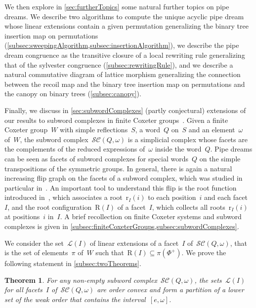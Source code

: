 \documentclass[reqno]{amsart}
\newtheorem{theoremA}{Theorem}
\theoremstyle{definition}
\newcommand{\linearExtensions}{\mathcal{L}} %
\newcommand{\subwordComplex}{\mathcal{SC}} %
\newcommand{\Roots}{\mathrm{R}} %
\newcommand{\rootFunction}[2]{\mathrm{r}_{#1}(#2)} %
\begin{document}
We then explore in \cref{sec:furtherTopics} some natural further topics on pipe dreams.
We describe two algorithms to compute the unique acyclic pipe dream whose linear extensions contain a given permutation generalizing the binary tree insertion map on permutations (\cref{subsec:sweepingAlgorithm,subsec:insertionAlgorithm}), we describe the pipe dream congruence as the transitive closure of a local rewriting rule generalizing that of the sylvester congruence (\cref{subsec:rewritingRule}), and we describe a natural commutative diagram of lattice morphism generalizing the connection between the recoil map and the binary tree insertion map on permutations and the canopy on binary trees (\cref{subsec:canopy}).

Finally, we discuss in \cref{sec:subwordComplexes} (partly conjectural) extensions of our results to subword complexes in finite Coxeter groups~\cite{KnutsonMiller-subwordComplex}.
Given a finite Coxeter group~$W$ with simple reflections~$S$, a word~$Q$ on~$S$ and an element~$\omega$ of~$W$, the subword complex~$\subwordComplex(Q,\omega)$ is a simplicial complex whose facets are the complements of the reduced expressions of~$\omega$ inside the word~$Q$.
Pipe dreams can be seen as facets of subword complexes for special words~$Q$ on the simple transpositions of the symmetric groups.
In general, there is again a natural increasing flip graph on the facets of a subword complex, which was studied in particular in~\cite{PilaudStump-ELlabelings}.
An important tool to understand this flip is the root function introduced in~\cite{CeballosLabbeStump}, which associates a root~$\rootFunction{I}{i}$ to each position~$i$ and each facet~$I$, and the root configuration~$\Roots(I)$ of a facet~$I$, which collects all roots~$\rootFunction{I}{i}$ at positions~$i$ in~$I$.
A brief recollection on finite Coxeter systems and subword complexes is given in \cref{subsec:finiteCoxeterGroups,subsec:subwordComplexes}.

We consider the set~$\linearExtensions(I)$ of linear extensions of a facet~$I$ of~$\subwordComplex(Q,\omega)$, that is the set of elements~$\pi$ of~$W$ such that~${\Roots(I) \subseteq \pi(\Phi^+)}$.
We prove the following statement in \cref{subsec:twoTheorems}.

\begin{theoremA}
\label{thm:B}
For any non-empty subword complex~$\subwordComplex(Q, \omega)$, the sets~$\linearExtensions(I)$ for all facets~$I$ of~$\subwordComplex(Q, \omega)$ are order convex and form a partition of a lower set of the weak order that contains the interval~$[e, \omega]$.
\end{theoremA}
\end{document}
